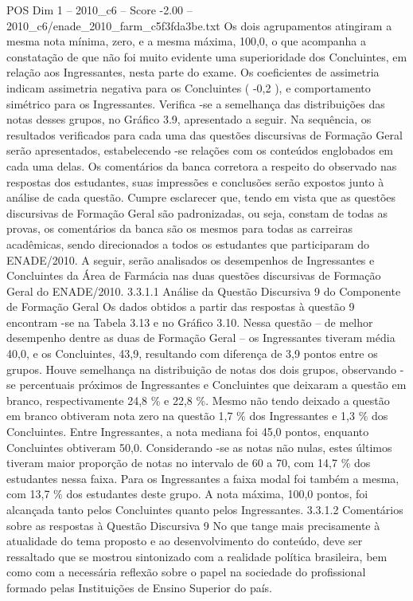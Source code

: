 \begin{textsample}{POS Dim 1 – 2010\_c6 – Score -2.00 – 2010\_c6/enade\_2010\_farm\_c5f3fda3be.txt}
Os dois agrupamentos atingiram a mesma nota mínima, zero, e a mesma máxima, 100,0, o que acompanha a constatação de que não foi muito evidente uma superioridade dos Concluintes, em relação aos Ingressantes, nesta parte do exame.
Os coeficientes de assimetria indicam assimetria negativa para os Concluintes ( -0,2 ), e comportamento simétrico para os Ingressantes.
Verifica -se a semelhança das distribuições das notas desses grupos, no Gráfico 3.9, apresentado a seguir.
Na sequência, os resultados verificados para cada uma das questões discursivas de Formação Geral serão apresentados, estabelecendo -se relações com os conteúdos englobados em cada uma delas.
Os comentários da banca corretora a respeito do observado nas respostas dos estudantes, suas impressões e conclusões serão expostos junto à análise de cada questão.
Cumpre esclarecer que, tendo em vista que as questões discursivas de Formação Geral são padronizadas, ou seja, constam de todas as provas, os comentários da banca são os mesmos para todas as carreiras acadêmicas, sendo direcionados a todos os estudantes que participaram do ENADE/2010.
A seguir, serão analisados os desempenhos de Ingressantes e Concluintes da Área de Farmácia nas duas questões discursivas de Formação Geral do ENADE/2010. 3.3.1.1 Análise da Questão Discursiva 9 do Componente de Formação Geral Os dados obtidos a partir das respostas à questão 9 encontram -se na Tabela 3.13 e no Gráfico 3.10.
Nessa questão – de melhor desempenho dentre as duas de Formação Geral – os Ingressantes tiveram média 40,0, e os Concluintes, 43,9, resultando com diferença de 3,9 pontos entre os grupos.
Houve semelhança na distribuição de notas dos dois grupos, observando -se percentuais próximos de Ingressantes e Concluintes que deixaram a questão em branco, respectivamente 24,8 \% e 22,8 \%.
Mesmo não tendo deixado a questão em branco obtiveram nota zero na questão 1,7 \% dos Ingressantes e 1,3 \% dos Concluintes.
Entre Ingressantes, a nota mediana foi 45,0 pontos, enquanto Concluintes obtiveram 50,0.
Considerando -se as notas não nulas, estes últimos tiveram maior proporção de notas no intervalo de 60 a 70, com 14,7 \% dos estudantes nessa faixa.
Para os Ingressantes a faixa modal foi também a mesma, com 13,7 \% dos estudantes deste grupo.
A nota máxima, 100,0 pontos, foi alcançada tanto pelos Concluintes quanto pelos Ingressantes. 3.3.1.2 Comentários sobre as respostas à Questão Discursiva 9 No que tange mais precisamente à atualidade do tema proposto e ao desenvolvimento do conteúdo, deve ser ressaltado que se mostrou sintonizado com a realidade política brasileira, bem como com a necessária reflexão sobre o papel na sociedade do profissional formado pelas Instituições de Ensino Superior do país.

\end{textsample}

